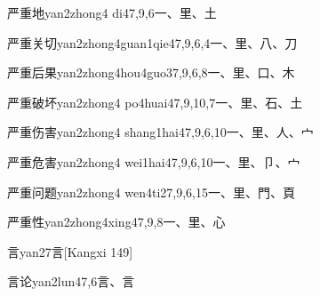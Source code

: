 \begin{EntryWithPhonetic}{严重地}{yan2zhong4 di4}{7,9,6}{⼀、⾥、⼟}
\end{EntryWithPhonetic}

\begin{EntryWithPhonetic}{严重关切}{yan2zhong4guan1qie4}{7,9,6,4}{⼀、⾥、⼋、⼑}
\end{EntryWithPhonetic}

\begin{EntryWithPhonetic}{严重后果}{yan2zhong4hou4guo3}{7,9,6,8}{⼀、⾥、⼝、⽊}
\end{EntryWithPhonetic}

\begin{EntryWithPhonetic}{严重破坏}{yan2zhong4 po4huai4}{7,9,10,7}{⼀、⾥、⽯、⼟}
\end{EntryWithPhonetic}

\begin{EntryWithPhonetic}{严重伤害}{yan2zhong4 shang1hai4}{7,9,6,10}{⼀、⾥、⼈、⼧}
\end{EntryWithPhonetic}

\begin{EntryWithPhonetic}{严重危害}{yan2zhong4 wei1hai4}{7,9,6,10}{⼀、⾥、⼙、⼧}
\end{EntryWithPhonetic}

\begin{EntryWithPhonetic}{严重问题}{yan2zhong4 wen4ti2}{7,9,6,15}{⼀、⾥、⾨、⾴}
\end{EntryWithPhonetic}

\begin{EntryWithPhonetic}{严重性}{yan2zhong4xing4}{7,9,8}{⼀、⾥、⼼}
\end{EntryWithPhonetic}

\begin{EntryWithPhonetic}{言}{yan2}{7}{⾔}[Kangxi 149]
\end{EntryWithPhonetic}

\begin{EntryWithPhonetic}{言论}{yan2lun4}{7,6}{⾔、⾔}
\end{EntryWithPhonetic}

